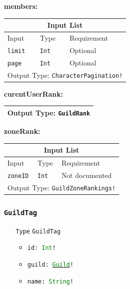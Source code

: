 \documentclass[10pt, a4paper]{memoir}
\numberwithin{equation}{section}
\theoremstyle{plain}
\theoremstyle{defp}
\theoremstyle{dotless}
\theoremstyle{definition}
\theoremstyle{dotless}
\theoremstyle{dotless}
\theoremstyle{defp}
\theoremstyle{defp}
\theoremstyle{be}          %
\theoremstyle{defp}
\newcommand\ttt[1]{\texttt{#1}}
\newcommand\type[1]{\ttt{\textcolor{green}{#1}}}
\begin{document}
\newpage

\textbf{members:}

\begin{table}[h!]
	\centering
	\begin{tabular}{ |p{4.2cm}|p{6cm}|p{3cm}|  }
		\hline
		\multicolumn{3}{|c|}{Input List} \\
		\hline
		Input & Type & Requirement\\
		\hline
		\ttt{limit} & \ttt{Int} & Optional\\
		\ttt{page} & \ttt{Int} & Optional\\
		\hline
		\multicolumn{3}{|c|}{Output Type: \ttt{CharacterPagination!}} \\
		\hline
	\end{tabular}
\end{table}

\medskip

\textbf{curentUserRank:}

\begin{table}[h!]
	\centering
	\begin{tabular}{ |p{4.2cm}|p{6cm}|p{3cm}|  }
		\hline
		\multicolumn{3}{|c|}{Output Type: \ttt{GuildRank}} \\
		\hline
	\end{tabular}
\end{table}

\medskip

\textbf{zoneRank:}

\begin{table}[h!]
	\centering
	\begin{tabular}{ |p{4.2cm}|p{6cm}|p{3cm}|  }
		\hline
		\multicolumn{3}{|c|}{Input List} \\
		\hline
		Input & Type & Requirement\\
		\hline
		\ttt{zoneID} & \ttt{Int} & Not documented\\
		\hline
		\multicolumn{3}{|c|}{Output Type: \ttt{GuildZoneRankings!}} \\
		\hline
	\end{tabular}
\end{table}

\medskip


\subsubsection{\ttt{GuildTag}}\label{sec:GuildTag}

\begin{itemize}[noitemsep,topsep=1pt]
\item[\ttt{Type}] \ttt{GuildTag}
\begin{itemize}[itemsep=1pt,topsep=1pt]
\item \ttt{id: \type{Int}!}
\item \ttt{guild: \hyperref[sec:Guild]{\type{Guild}}!}
\item \ttt{name: \type{String}!}
\end{itemize}
\end{itemize}
\end{document}
